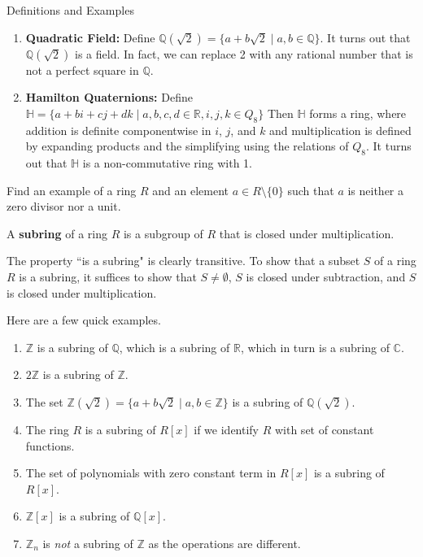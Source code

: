 \begin{section}{Definitions and Examples}
\begin{example}
\begin{enumerate}[label=\rm{(\alph*)}]
\item \textbf{Quadratic Field:} Define $\mathbb{Q}(\sqrt{2})=\{a+b\sqrt{2}\mid a,b\in\mathbb{Q}\}$.  It turns out that $\mathbb{Q}(\sqrt{2})$ is a field.  In fact, we can replace 2 with any rational number that is not a perfect square in $\mathbb{Q}$.
\item \textbf{Hamilton Quaternions:} Define $\mathbb{H}=\{a+bi+cj+dk\mid a,b,c,d\in\mathbb{R}, i,j,k\in Q_8\}$  Then $\mathbb{H}$ forms a ring, where addition is definite componentwise in $i$, $j$, and $k$ and multiplication is defined by expanding products and the simplifying using the relations of $Q_8$.  It turns out that $\mathbb{H}$ is a non-commutative ring with 1.
\end{enumerate}
\end{example}

\begin{problem}
Find an example of a ring $R$ and an element $a\in R\setminus\{0\}$ such that $a$ is neither a zero divisor nor a unit.
\end{problem}

\begin{definition}
A \textbf{subring} of a ring $R$ is a subgroup of $R$ that is closed under multiplication.
\end{definition}

\begin{remark}
The property ``is a subring" is clearly transitive. To show that a subset $S$ of a ring $R$ is a subring, it suffices to show that $S\neq \emptyset$, $S$ is closed under subtraction, and $S$ is closed under multiplication.
\end{remark}

\begin{example}
Here are a few quick examples.
\begin{enumerate}[label=\rm{(\alph*)}]
\item $\mathbb{Z}$ is a subring of $\mathbb{Q}$, which is a subring of $\mathbb{R}$, which in turn is a subring of $\mathbb{C}$.
\item $2\mathbb{Z}$ is a subring of $\mathbb{Z}$.
\item The set $\mathbb{Z}(\sqrt{2})=\{a+b\sqrt{2}\mid a,b\in\mathbb{Z}\}$ is a subring of $\mathbb{Q}(\sqrt{2})$.
\item The ring $R$ is a subring of $R[x]$ if we identify $R$ with set of constant functions.
\item The set of polynomials with zero constant term in $R[x]$ is a subring of $R[x]$.
\item $\mathbb{Z}[x]$ is a subring of $\mathbb{Q}[x]$.
\item $\mathbb{Z}_n$ is \emph{not} a subring of $\mathbb{Z}$ as the operations are different.
\end{enumerate} 
\end{example}


\end{section}
